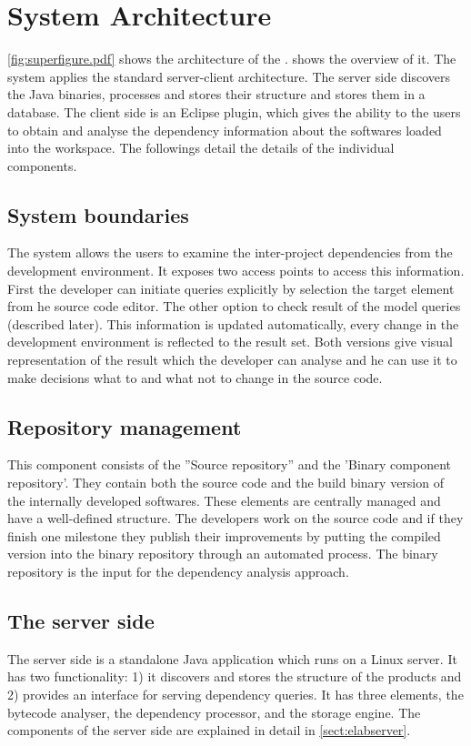 \section{System Architecture}

\autoref{fig:superfigure.pdf}  shows the architecture of the \ptool{}.
shows the overview of it. The system applies the standard server-client
architecture. The server side discovers the Java binaries, processes and stores
their structure and stores them in a database. The client side is an Eclipse
plugin, which gives the ability to the users to obtain and analyse the
dependency information about the softwares loaded into the workspace. The followings
detail the details of the individual components.


\subsection{System boundaries}
The system allows the users to examine the inter-project dependencies from the
development environment. It exposes two access points to access this
information. First the developer can initiate queries explicitly by selection
the target element from  he source code editor. The other option to check result
of the model queries (described later). This information is updated
automatically, every change in the development environment is reflected to the
result set. Both versions give visual representation of the result which the
developer can analyse and he can use it to make decisions what to and what not
to change in the source code.


\subsection{Repository management}
This component consists of the ''Source repository'' and the 'Binary component
repository'. They contain both the source code and the build binary version of
the internally developed softwares. These elements are centrally managed and
have a well-defined structure. The developers work on the source code and if
they finish one milestone they publish their improvements by putting the
compiled version into the binary repository through an automated process.
The binary repository is the input for the dependency analysis approach.

\subsection{The server side}
The server side is a standalone Java application which runs on a Linux server.
It has two functionality: 1) it discovers and stores the structure of the
products and 2) provides an interface for serving dependency queries. It has three
elements, the bytecode analyser, the dependency processor, and the storage engine.
The components of the server side are explained in detail in \autoref{sect:elabserver}.


